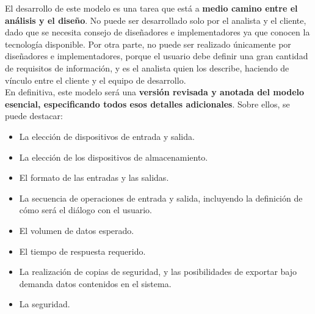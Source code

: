 El desarrollo de este modelo es una tarea que está a \textbf{medio camino entre el análisis y el diseño}. No puede ser desarrollado solo por el analista y el cliente, dado que se necesita consejo de diseñadores e implementadores ya que conocen la tecnología disponible. Por otra parte, no puede ser realizado únicamente por diseñadores e implementadores, porque el usuario debe definir una gran cantidad de requisitos de información, y es el analista quien los describe, haciendo de vínculo entre el cliente y el equipo de desarrollo.\\

En definitiva, este modelo será una \textbf{versión revisada y anotada del modelo esencial, especificando todos esos detalles adicionales}. Sobre ellos, se puede destacar:

\begin{itemize}
    \item La elección de dispositivos de entrada y salida.
    \item La elección de los dispositivos de almacenamiento.
    \item El formato de las entradas y las salidas.
    \item La secuencia de operaciones de entrada y salida, incluyendo la definición de cómo será el diálogo con el usuario.
    \item El volumen de datos esperado.
    \item El tiempo de respuesta requerido.
    \item La realización de copias de seguridad, y las posibilidades de exportar bajo demanda datos contenidos en el sistema.
    \item La seguridad.
\end{itemize}
